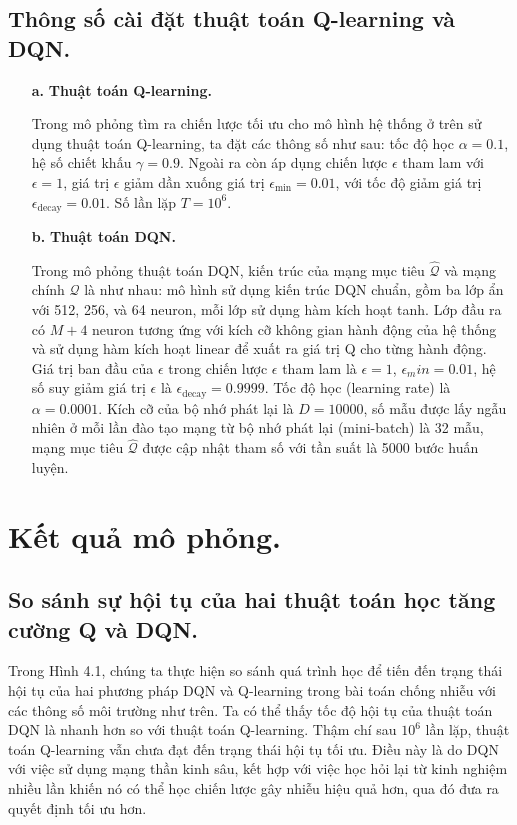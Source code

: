 \documentclass{uetgraduation}
\begin{document}
\subsection{Thông số cài đặt thuật toán Q-learning và DQN.}
\begin{itemize}
    \item[\textbf{a.}] \textbf{Thuật toán Q-learning.}
    
    Trong mô phỏng tìm ra chiến lược tối ưu cho mô hình hệ thống ở trên sử dụng thuật toán Q-learning, ta đặt các thông số như sau: tốc độ học $\alpha = 0.1$,
    hệ số chiết khấu $\gamma = 0.9$. Ngoài ra còn áp dụng chiến lược $\epsilon$ tham lam với $\epsilon = 1$, giá trị $\epsilon$ giảm dần xuống giá trị $\epsilon_\text{min} = 0.01$,
    với tốc độ giảm giá trị $\epsilon_\text{decay} = 0.01$. Số lần lặp $T = 10^6$.
    \item[\textbf{b.}] \textbf{Thuật toán DQN.}
    
    Trong mô phỏng thuật toán DQN, kiến trúc của mạng mục tiêu $\hat{\mathcal{Q}}$ và mạng chính $\mathcal{Q}$ là như nhau: mô hình sử dụng kiến trúc DQN chuẩn, 
    gồm ba lớp ẩn với 512, 256, và 64 neuron, mỗi lớp sử dụng hàm kích hoạt tanh. Lớp đầu ra có $M+4$ neuron tương ứng với kích cỡ không gian hành động của hệ thống 
    và sử dụng hàm kích hoạt linear để xuất ra giá trị Q cho từng hành động. Giá trị ban đầu của $\epsilon$ trong chiến lược $\epsilon$ tham lam là $\epsilon = 1$,
    $\epsilon_min = 0.01$, hệ số suy giảm giá trị $\epsilon$ là $\epsilon_\text{decay} = 0.9999$. Tốc độ học (learning rate) là $\alpha = 0.0001$. Kích cỡ của bộ
    nhớ phát lại là $D = 10000$, số mẫu được lấy ngẫu nhiên ở mỗi lần đào tạo mạng từ bộ nhớ phát lại (mini-batch) là 32 mẫu, mạng mục tiêu $\hat{\mathcal{Q}}$ được cập
    nhật tham số với tần suất là 5000 bước huấn luyện.
\end{itemize}

\section{Kết quả mô phỏng.}
\subsection{So sánh sự hội tụ của hai thuật toán học tăng cường Q và DQN.}
Trong Hình 4.1, chúng ta thực hiện so sánh quá trình học để tiến đến trạng thái hội tụ của hai phương pháp DQN và Q-learning trong bài toán
chống nhiễu với các thông số môi trường như trên. Ta có thể thấy tốc độ hội tụ của thuật toán DQN là nhanh hơn so với thuật toán Q-learning.
Thậm chí sau $10^6$ lần lặp, thuật toán Q-learning vẫn chưa đạt đến trạng thái hội tụ tối ưu. Điều này là do DQN với việc sử dụng mạng thần
kinh sâu, kết hợp với việc học hỏi lại từ kinh nghiệm nhiều lần khiến nó có thể học chiến lược gây nhiễu hiệu quả hơn, qua đó đưa ra quyết định
tối ưu hơn.
\end{document}
